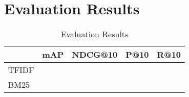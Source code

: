 \section{Evaluation Results}
\label{sec:results}


\begin{table}[]
\center
\begin{tabular}{|l|l|l|l|l|}
\hline
      & mAP & NDCG@10 & P@10 & R@10 \\
\hline
TFIDF &     &         &      &      \\
\hline
BM25  &     &         &      &      \\
\hline
\end{tabular}
\caption{Evaluation Results}
\label{table:results}
\end{table}

